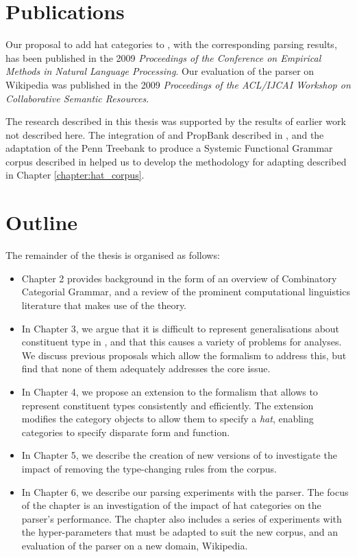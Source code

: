 \section{Publications}

Our proposal to add hat categories to \ccg, with the corresponding parsing
results, has been published in the 2009 \emph{Proceedings of the Conference on
Empirical Methods in Natural Language Processing}. Our evaluation of the \candc
parser on Wikipedia was published in the 2009 \emph{Proceedings of the ACL/IJCAI
Workshop on Collaborative Semantic Resources}.

The research described in this thesis was supported by the results of earlier
work not described here. The integration of \ccgbank and PropBank described in
\citet{honnibal:pacling07prop}, and the adaptation of the Penn Treebank to
produce a Systemic Functional Grammar corpus described in
\citep{honnibal:dlp07sfl} helped us to develop the methodology for adapting
\ccgbank described in Chapter \ref{chapter:hat_corpus}. 

\section{Outline}

The remainder of the thesis is organised as follows:

\begin{itemize}
 \item Chapter 2 provides background in the form of an overview of 
Combinatory Categorial Grammar, and a
review of the prominent computational linguistics literature that makes use of
the theory.
 \item In Chapter 3, we argue that it is difficult to represent generalisations
about constituent type in \ccg, and that this causes a variety of problems for
\ccg analyses.
We discuss previous proposals which allow the formalism to address this,
but find that none of them adequately addresses the core issue.
 \item In Chapter 4, we propose an extension to the formalism that allows \ccg to
represent constituent types consistently and efficiently. The extension modifies
the category objects to allow them to specify a \emph{hat}, enabling categories
to specify disparate form and function.
 \item In Chapter 5, we describe the creation of new versions of \ccgbank to
investigate the impact of removing the type-changing rules from the corpus.
 \item In Chapter 6, we describe our parsing experiments with the \candc parser.
The focus of the chapter is an investigation of the impact of hat categories on
the parser's performance. The chapter also includes a series of experiments with
the hyper-parameters that must be adapted to suit the new corpus, and an
evaluation of the parser on a new domain, Wikipedia.
\end{itemize}
